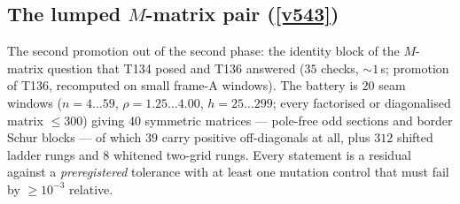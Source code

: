 \documentclass[11pt,a4paper]{article}
\begin{document}
\subsection{The lumped \texorpdfstring{$M$}{M}-matrix pair (\texorpdfstring{\vref{v543}}{v543})}\label{sec:v543}
The second promotion out of the second phase: the identity block of the $M$-matrix question that T134
posed and T136 answered  ($35$ checks, ${\sim}1$\,s; promotion
of T136, recomputed on small frame-A windows). The battery is $20$ seam windows
($n=4\ldots59$, $\rho=1.25\ldots4.00$, $h=25\ldots299$; every factorised or diagonalised matrix
$\le300$) giving $40$ symmetric matrices --- pole-free odd sections and border Schur blocks --- of
which $39$ carry positive off-diagonals at all, plus $312$ shifted ladder rungs and $8$ whitened
two-grid rungs. Every statement is a residual against a \emph{preregistered} tolerance with at least
one mutation control that must fail by $\ge10^{-3}$ relative.
\end{document}
